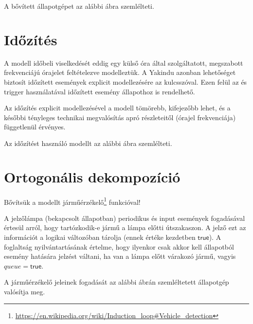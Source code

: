 A bővített állapotgépet az alábbi ábra szemlélteti.


\section{Időzítés}

A modell időbeli viselkedését eddig egy külső óra által szolgáltatott, megszabott frekvenciájú órajelet feltételezve modelleztük. A Yakindu azonban lehetőséget biztosít időzített események explicit modellezésére az  kulcsszóval. Ezen felül az  és  trigger használatával időzített esemény állapothoz is rendelhető.

Az időzítés explicit modellezésével a modell tömörebb, kifejezőbb lehet, és a későbbi tényleges technikai megvalósítás apró részleteitől (órajel frekvenciája) függetlenül érvényes. 

Az időzítést használó modellt az alábbi ábra szemlélteti.


\section{Ortogonális dekompozíció}

Bővítsük a modellt járműérzékelő\footnote{\url{https://en.wikipedia.org/wiki/Induction\_loop\#Vehicle\_detection}} funkcióval!

\begin{tipp}
	A jelzőlámpa (bekapcsolt állapotban) periodikus  és  input események fogadásával értesül arról, hogy tartózkodik-e jármű a lámpa előtti útszakaszon. A jelző ezt az információt a  logikai változóban tárolja (ennek értéke kezdetben $\mathsf{true}$). A foglaltság nyilvántartásának értelme, hogy ilyenkor csak akkor kell  állapotból  esemény hatására jelzést váltani, ha van a lámpa előtt várakozó jármű, vagyis $\mathit{queue} = \mathsf{true}$.
\end{tipp}

A járműérzékelő jeleinek fogadását az alábbi ábrán szemléltetett állapotgép valósítja meg.


